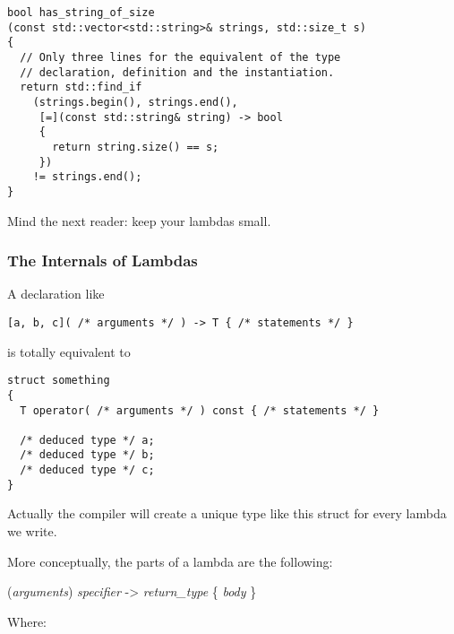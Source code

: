 \begin{lstlisting}
bool has_string_of_size
(const std::vector<std::string>& strings, std::size_t s)
{
  // Only three lines for the equivalent of the type
  // declaration, definition and the instantiation.
  return std::find_if
    (strings.begin(), strings.end(),
     [=](const std::string& string) -> bool
     {
       return string.size() == s;
     })
    != strings.end();
}
\end{lstlisting}

\begin{guideline}
  Mind the next reader: keep your lambdas small.
\end{guideline}

\subsubsection{The Internals of Lambdas}
\label{lambdas-internals}

A declaration like

\begin{lstlisting}
[a, b, c]( /* arguments */ ) -> T { /* statements */ }
\end{lstlisting}

is totally equivalent to

\begin{lstlisting}
struct something
{
  T operator( /* arguments */ ) const { /* statements */ }

  /* deduced type */ a;
  /* deduced type */ b;
  /* deduced type */ c;
}
\end{lstlisting}

Actually the compiler will create a unique type like this struct for
every lambda we write.

More conceptually, the parts of a lambda are the following:

\bigskip

\indent [{\it capture}]({\it arguments}) {\it specifier} -\textgreater
        {\it return\_type} \{ {\it body} \}

\bigskip

Where:

